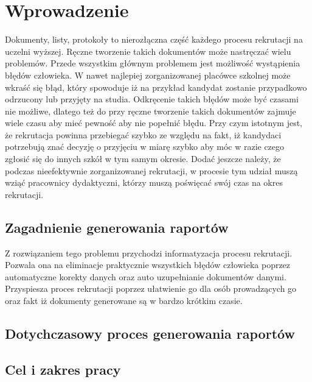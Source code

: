 \chapter{Wprowadzenie}

Dokumenty, listy, protokoły to nierozłączna część każdego procesu rekrutacji na uczelni wyższej. Ręczne tworzenie takich dokumentów może nastręczać wielu problemów. Przede wszystkim głównym problemem jest możliwość wystąpienia błędów człowieka. W nawet najlepiej zorganizowanej placówce szkolnej może wkraść się błąd, który spowoduje iż na przykład kandydat zostanie przypadkowo odrzucony lub przyjęty na studia. Odkręcenie takich błędów może być czasami nie możliwe, dlatego też do przy ręczne tworzenie takich dokumentów zajmuje wiele czasu aby mieć pewność aby nie popełnić błędu. Przy czym istotnym jest, że rekrutacja powinna przebiegać szybko ze względu na fakt, iż kandydaci potrzebują znać decyzję o przyjęciu w miarę szybko aby móc w razie czego zgłosić się do innych szkół w tym samym okresie. Dodać jeszcze należy, że podczas nieefektywnie zorganizowanej rekrutacji, w procesie tym udział muszą wziąć pracownicy dydaktyczni, którzy muszą poświęcać swój czas na okres rekrutacji.


\section{ Zagadnienie generowania raportów}

Z rozwiązaniem tego problemu przychodzi informatyzacja procesu rekrutacji. Pozwala ona na eliminacje praktycznie wszystkich błędów człowieka poprzez automatyczne korekty danych oraz auto uzupełnianie dokumentów danymi. Przyspiesza proces rekrutacji poprzez ułatwienie go dla osób prowadzących go oraz fakt iż dokumenty generowane są w bardzo krótkim czasie.


\section{ Dotychczasowy proces generowania raportów}

\section{Cel i zakres pracy}

